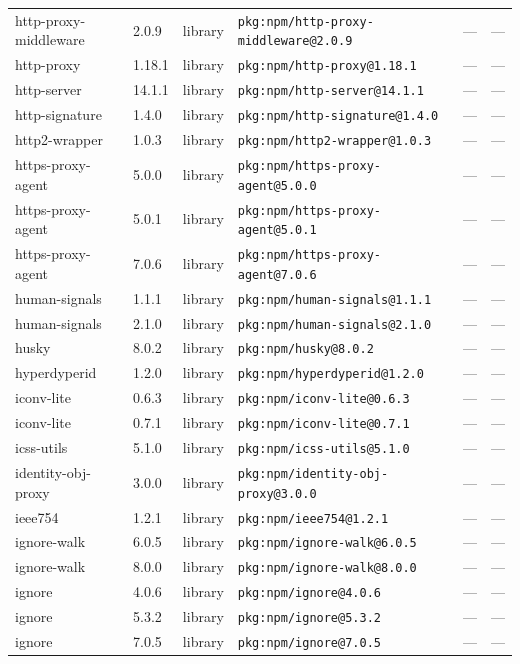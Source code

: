 \documentclass[11pt]{article}
\begin{document}
\begin{longtable}{|l|l|l|p{2.2cm}|l|p{4cm}|}
http-proxy-middleware & 2.0.9 & library & \texttt{pkg:npm/http-proxy-middleware@2.0.9} & — & — \\
http-proxy & 1.18.1 & library & \texttt{pkg:npm/http-proxy@1.18.1} & — & — \\
http-server & 14.1.1 & library & \texttt{pkg:npm/http-server@14.1.1} & — & — \\
http-signature & 1.4.0 & library & \texttt{pkg:npm/http-signature@1.4.0} & — & — \\
http2-wrapper & 1.0.3 & library & \texttt{pkg:npm/http2-wrapper@1.0.3} & — & — \\
https-proxy-agent & 5.0.0 & library & \texttt{pkg:npm/https-proxy-agent@5.0.0} & — & — \\
https-proxy-agent & 5.0.1 & library & \texttt{pkg:npm/https-proxy-agent@5.0.1} & — & — \\
https-proxy-agent & 7.0.6 & library & \texttt{pkg:npm/https-proxy-agent@7.0.6} & — & — \\
human-signals & 1.1.1 & library & \texttt{pkg:npm/human-signals@1.1.1} & — & — \\
human-signals & 2.1.0 & library & \texttt{pkg:npm/human-signals@2.1.0} & — & — \\
husky & 8.0.2 & library & \texttt{pkg:npm/husky@8.0.2} & — & — \\
hyperdyperid & 1.2.0 & library & \texttt{pkg:npm/hyperdyperid@1.2.0} & — & — \\
iconv-lite & 0.6.3 & library & \texttt{pkg:npm/iconv-lite@0.6.3} & — & — \\
iconv-lite & 0.7.1 & library & \texttt{pkg:npm/iconv-lite@0.7.1} & — & — \\
icss-utils & 5.1.0 & library & \texttt{pkg:npm/icss-utils@5.1.0} & — & — \\
identity-obj-proxy & 3.0.0 & library & \texttt{pkg:npm/identity-obj-proxy@3.0.0} & — & — \\
ieee754 & 1.2.1 & library & \texttt{pkg:npm/ieee754@1.2.1} & — & — \\
ignore-walk & 6.0.5 & library & \texttt{pkg:npm/ignore-walk@6.0.5} & — & — \\
ignore-walk & 8.0.0 & library & \texttt{pkg:npm/ignore-walk@8.0.0} & — & — \\
ignore & 4.0.6 & library & \texttt{pkg:npm/ignore@4.0.6} & — & — \\
ignore & 5.3.2 & library & \texttt{pkg:npm/ignore@5.3.2} & — & — \\
ignore & 7.0.5 & library & \texttt{pkg:npm/ignore@7.0.5} & — & — \\

\end{longtable}
\end{document}
